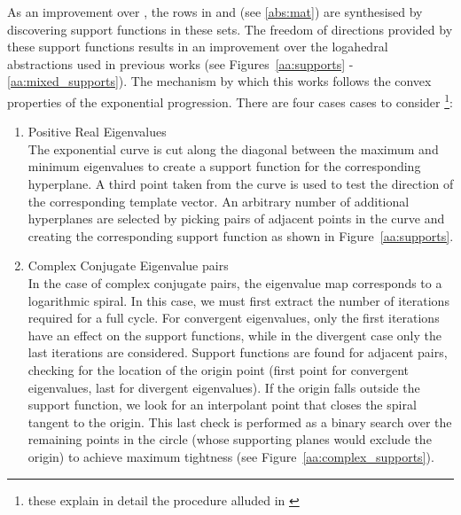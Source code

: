 \documentclass{IEEEtran}
\begin{document}
As an improvement over \cite{JSS14}, the rows in  and  (see \eqref{abs:mat}) are synthesised by discovering
support functions in these sets. The freedom of directions provided by these support functions results in an improvement over the logahedral abstractions used in previous works (see Figures~\ref{aa:supports} - \ref{aa:mixed_supports}).
The mechanism by which this works follows the convex properties of the exponential progression. 
There are four cases cases to consider \footnote{these explain in detail the procedure alluded in \cite{cattaruzza2015unbounded}}:
\begin{enumerate}
\item Positive Real Eigenvalues\\
The exponential curve is cut along the diagonal between the maximum and minimum eigenvalues to create a support function for the corresponding hyperplane. A third point taken from the curve is used to test the direction of the corresponding template vector. An arbitrary number of additional hyperplanes are selected by picking pairs of adjacent points in the curve and creating the corresponding support function as shown in Figure~\ref{aa:supports}.
\item Complex Conjugate Eigenvalue pairs\\
In the case of complex conjugate pairs, the eigenvalue map corresponds to a logarithmic spiral. In this case, we must first extract the number of iterations required for a full cycle. For convergent eigenvalues, only the first  iterations have an effect on the support functions, while in the divergent case only the last  iterations are considered. Support functions are found for adjacent pairs, checking for the location of the origin point (first point for convergent eigenvalues, last for divergent eigenvalues). If the origin falls outside the support function, we look for an interpolant point that closes the spiral tangent to the origin. This last check is performed as a binary search over the remaining points in the circle (whose supporting planes would exclude the origin) to achieve maximum tightness (see Figure~\ref{aa:complex_supports}).


\end{enumerate}
\end{document}
